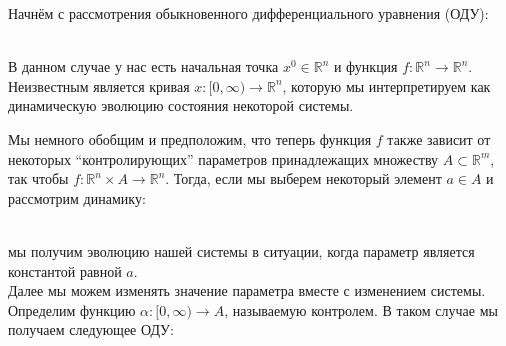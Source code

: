 
\graphicspath{ {imgs/} }






Начнём с рассмотрения обыкновенного дифференциального уравнения (ОДУ): \\

\

В данном случае у нас есть начальная точка $x^0 \in \mathbb{R}^n$ и функция $f: \mathbb{R}^n  \rightarrow \mathbb{R}^n$. Неизвестным является кривая $x: [0, \infty) \rightarrow \mathbb{R}^n$, которую мы интерпретируем как динамическую эволюцию состояния некоторой системы. \\


Мы немного обобщим и предположим, что теперь функция $f$ также зависит от некоторых ``контролирующих'' параметров принадлежащих множеству $A \subset \mathbb{R}^m$, так чтобы $f: \mathbb{R}^n \times A \rightarrow \mathbb{R}^n$. Тогда, если мы выберем некоторый элемент $a \in A$ и рассмотрим динамику: \\

\

мы получим эволюцию нашей системы в ситуации, когда параметр является константой равной $a$. \\

Далее мы можем изменять значение параметра вместе с изменением системы. Определим функцию $\alpha: [0, \infty) \rightarrow A$, называемую контролем. В таком случае мы получаем следующее ОДУ: \\

\

